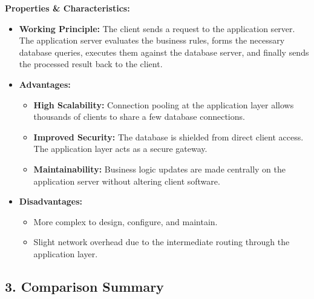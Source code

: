 \documentclass[12pt,a3paper]{article}
\begin{document}
\begin{enumerate}
\begin{tcolorbox}[enhanced,breakable,ansbox,colback=cA!4,colframe=cA,boxrule=0.8pt,arc=5pt,title={\textbf{Answer}},fonttitle=\bfseries\color{white},colbacktitle=cA]
\textbf{Properties \& Characteristics:}
\begin{itemize}
    \item \textbf{Working Principle:} The client sends a request to the application server. The application server evaluates the business rules, forms the necessary database queries, executes them against the database server, and finally sends the processed result back to the client.
    \item \textbf{Advantages:} 
        \begin{itemize}
            \item \textbf{High Scalability:} Connection pooling at the application layer allows thousands of clients to share a few database connections.
            \item \textbf{Improved Security:} The database is shielded from direct client access. The application layer acts as a secure gateway.
            \item \textbf{Maintainability:} Business logic updates are made centrally on the application server without altering client software.
        \end{itemize}
    \item \textbf{Disadvantages:} 
        \begin{itemize}
            \item More complex to design, configure, and maintain.
            \item Slight network overhead due to the intermediate routing through the application layer.
        \end{itemize}
\end{itemize}

\vspace{1em}

\subsection*{3. Comparison Summary}


\end{tcolorbox}
\end{enumerate}
\end{document}
